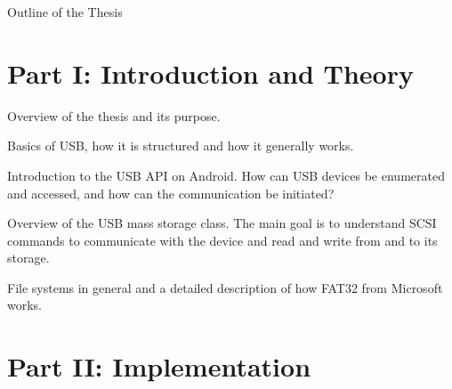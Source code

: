\clearemptydoublepage

{}

\begin{center}
	\huge{Outline of the Thesis}
\end{center}




\section*{Part I: Introduction and Theory}

  \vspace{1mm}

\noindent  Overview of the thesis and its purpose. \\

  \vspace{1mm}

\noindent  Basics of USB, how it is structured and how it generally works.   \\

  \vspace{1mm}

\noindent  Introduction to the USB API on Android. How can USB devices be enumerated and accessed, and how can the communication be initiated? \\

  \vspace{1mm}

\noindent  Overview of the USB mass storage class. The main goal is to understand SCSI commands to communicate with the device and read and write from and to its storage. \\

  \vspace{1mm}

\noindent  File systems in general and a detailed description of how FAT32 from Microsoft works. \\

\section*{Part II: Implementation}

